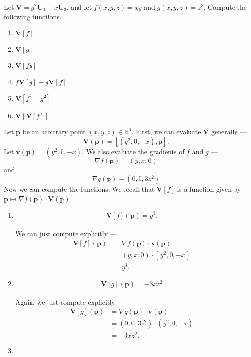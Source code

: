 \documentclass[12 pt, letterpaper]{hmcpset}
\begin{document}
\begin{problem}[Problem 2.]
	Let $\mathbf V = y^2 \mathbf U_1 - x \mathbf U_3$, and let $f(x, y, z) = xy$ and $g(x, y, z) = z^3$. Compute the following functions.
	\begin{enumerate}
		\item $\mathbf V[f]$
		\item $\mathbf V[g]$
		\item $\mathbf V[fg]$
		\item $f \mathbf V[g] - g \mathbf V[f]$
		\item $\mathbf V[f^2 + g^2]$
		\item $\mathbf V[\mathbf V[f]]$
	\end{enumerate}
\end{problem}

\begin{solution}
	Let $\mathbf p$ be an arbitrary point $(x, y, z) \in \mathbb R^3$. First, we can evaluate $\mathbf V$ generally ---
	\[
		\mathbf V(\mathbf p) = [(y^2, 0, -x), \mathbf p].
	\]
	Let $\mathbf v(\mathbf p) = (y^2, 0, -x)$. We also evaluate the gradients of $f$ and $g$ ---
	\[
		\nabla f(\mathbf p) = (y, x, 0)	
	\]
	and
	\[
		\nabla g(\mathbf p) = (0, 0, 3z^2)
	\]
	Now we can compute the functions. We recall that $\mathbf V [f]$ is a function given by $\mathbf p \mapsto \nabla f(\mathbf p) \cdot \mathbf V(\mathbf p)$.
	\begin{enumerate}
		\item 
			\[
				\boxed{
					\mathbf V[f](\mathbf p) = y^3.
				}
			\] \\
			We can just compute explicitly ---
			\[
				\begin{split}
					\mathbf V[f](\mathbf p) & = \nabla f(\mathbf p) \cdot \mathbf v(\mathbf p) \\
								& = (y, x, 0) \cdot (y^2, 0, -x) \\
								& = y^3.
				\end{split}
			\]
		\item
			\[
				\boxed{
					\mathbf V[g](\mathbf p) = - 3 x z^2
				}
			\] \\
			Again, we just compute explicitly
			\[
				\begin{split}
					\mathbf V[g](\mathbf p) & = \nabla g(\mathbf p) \cdot \mathbf v(\mathbf p) \\
								& = (0, 0, 3z^2) \cdot (y^2, 0, -x) \\
								& = - 3x z^2.
				\end{split}
			\]
		\item

\end{enumerate}
\end{solution}
\end{document}
